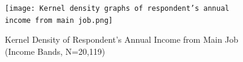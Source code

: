 \documentclass[serif, aspectratio=169]{beamer}
\begin{document}
\begin{frame}[label=income_band]
\begin{columns}[T]
\begin{column}{0.7\textwidth}
\begin{table}
\begin{tabular}{lcccccccccccccc}
                    \bottomrule
                \end{tabular}
            \end{table}
            \vspace{-0.63cm}
            \begin{figure}
                \texttt{[image: Kernel density graphs of respondent’s annual income from main job.png]}
                \vspace{-0.15cm}
                \captionsetup{font=tiny}
                \caption{Kernel Density of Respondent's Annual Income from Main Job (Income Bands, N=20,119)}
                \label{fig:Kernel_density}
            \end{figure}
        \end{column}
        \begin{column}{0.3\textwidth}
    \vspace{3.0cm}
    \hspace{-1.1cm}
\end{column}
    \end{columns}
\end{frame}

\end{document}
